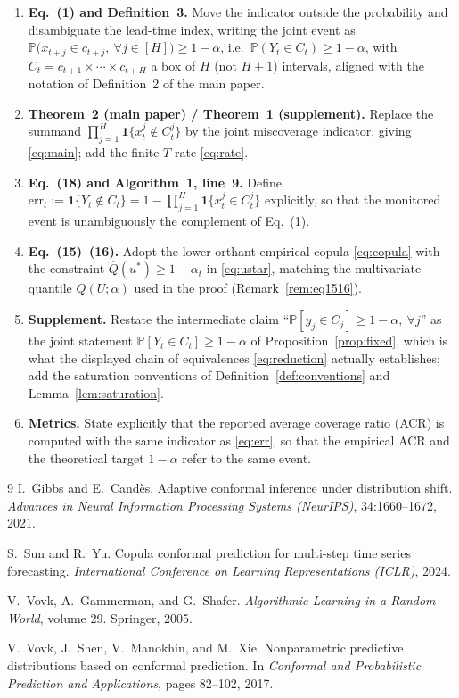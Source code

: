 \documentclass[11pt]{article}
\theoremstyle{definition}
\theoremstyle{remark}
\newcommand{\PR}{\mathbb{P}}
\newcommand{\ind}{\mathbf{1}}
\newcommand{\err}{\mathrm{err}}
\newcommand{\horizon}{[H]}
\begin{document}
\begin{enumerate}[label=(\roman*),leftmargin=*]
  \item \textbf{Eq.~(1) and Definition~3.} Move the indicator outside the
        probability and disambiguate the lead-time index, writing the joint
        event as
        $\PR\bigl(x_{t+j}\in c_{t+j},\ \forall j\in\horizon\bigr)\ge1-\alpha$,
        i.e.\ $\PR(Y_t\in C_t)\ge1-\alpha$, with
        $C_t=c_{t+1}\times\cdots\times c_{t+H}$ a box of $H$ (not $H+1$)
        intervals, aligned with the notation of Definition~2 of the main paper.
  \item \textbf{Theorem~2 (main paper) / Theorem~1 (supplement).} Replace the
        summand $\prod_{j=1}^{H}\ind\{x_t^{j}\notin C_t^{j}\}$ by the joint
        miscoverage indicator, giving \eqref{eq:main}; add the finite-$T$ rate
        \eqref{eq:rate}.
  \item \textbf{Eq.~(18) and Algorithm~1, line~9.} Define
        $\err_t:=\ind\{Y_t\notin C_t\}
        =1-\prod_{j=1}^{H}\ind\{x_t^{j}\in C_t^{j}\}$ explicitly, so that the
        monitored event is unambiguously the complement of Eq.~(1).
  \item \textbf{Eq.~(15)--(16).} Adopt the lower-orthant empirical copula
        \eqref{eq:copula} with the constraint $\widehat{Q}(u^{*})\ge1-\alpha_t$
        in \eqref{eq:ustar}, matching the multivariate quantile
        $Q(U;\alpha)$ used in the proof (Remark~\ref{rem:eq1516}).
  \item \textbf{Supplement.} Restate the intermediate claim
        ``$\PR[y_j\in C_j]\ge1-\alpha,\ \forall j$'' as the joint statement
        $\PR[Y_t\in C_t]\ge1-\alpha$ of Proposition~\ref{prop:fixed}, which is
        what the displayed chain of equivalences \eqref{eq:reduction} actually
        establishes; add the saturation conventions of
        Definition~\ref{def:conventions} and Lemma~\ref{lem:saturation}.
  \item \textbf{Metrics.} State explicitly that the reported average coverage
        ratio (ACR) is computed with the same indicator as
        \eqref{eq:err}, so that the empirical ACR and the theoretical target
        $1-\alpha$ refer to the same event.
\end{enumerate}

\begin{thebibliography}{9}
I.~Gibbs and E.~Cand\`es.
\newblock Adaptive conformal inference under distribution shift.
\newblock \emph{Advances in Neural Information Processing Systems (NeurIPS)},
34:1660--1672, 2021.

S.~Sun and R.~Yu.
\newblock Copula conformal prediction for multi-step time series forecasting.
\newblock \emph{International Conference on Learning Representations (ICLR)},
2024.

V.~Vovk, A.~Gammerman, and G.~Shafer.
\newblock \emph{Algorithmic Learning in a Random World}, volume 29.
\newblock Springer, 2005.

V.~Vovk, J.~Shen, V.~Manokhin, and M.~Xie.
\newblock Nonparametric predictive distributions based on conformal prediction.
\newblock In \emph{Conformal and Probabilistic Prediction and Applications},
pages 82--102, 2017.
\end{thebibliography}
\end{document}
